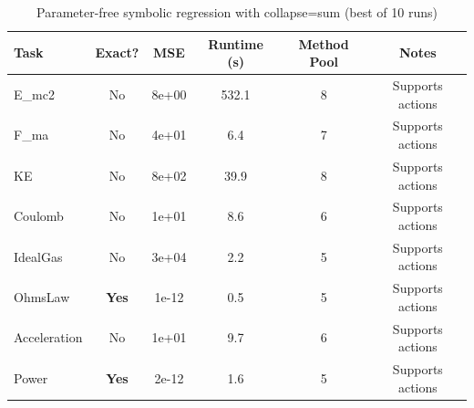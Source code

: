 \begin{table}[h]
\centering
\caption{Parameter-free symbolic regression with collapse=sum (best of 10 runs)}
\label{tab:baselines_sum}
\begin{tabular}{lccccc}
\toprule
Task & Exact? & MSE & Runtime (s) & Method Pool & Notes \\
\midrule
E_mc2 & No & 8e+00 & 532.1 & 8 & Supports actions \\
\midrule
F_ma & No & 4e+01 & 6.4 & 7 & Supports actions \\
\midrule
KE & No & 8e+02 & 39.9 & 8 & Supports actions \\
\midrule
Coulomb & No & 1e+01 & 8.6 & 6 & Supports actions \\
\midrule
IdealGas & No & 3e+04 & 2.2 & 5 & Supports actions \\
\midrule
OhmsLaw & \textbf{Yes} & 1e-12 & 0.5 & 5 & Supports actions \\
\midrule
Acceleration & No & 1e+01 & 9.7 & 6 & Supports actions \\
\midrule
Power & \textbf{Yes} & 2e-12 & 1.6 & 5 & Supports actions \\
\midrule
\bottomrule
\end{tabular}
\end{table}